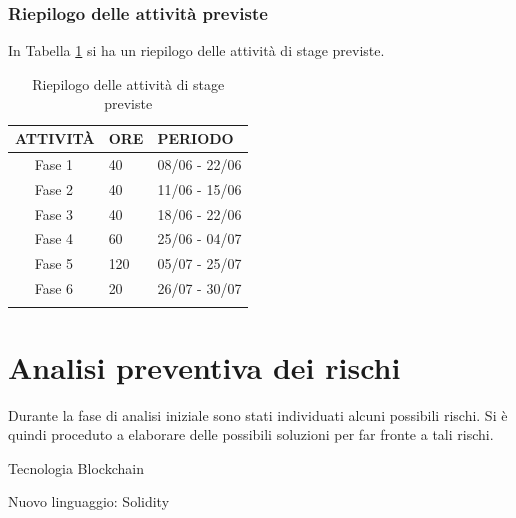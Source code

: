 \subsubsection{Riepilogo delle attività previste}
In Tabella \ref{tab:riepilogoOre} si ha un riepilogo delle attività di stage previste.
\begin{longtable}{|r l|p{1cm}|p{3cm}|}
	\hline
	\multicolumn{2}{|c|}{\textbf{ATTIVITÀ}} & \textbf{ORE} & \textbf{PERIODO}\tabularnewline
	\hline
	& Fase 1 & \centerline{40} & 08/06 - 22/06 \\\hline	
	& Fase 2 & \centerline{40} & 11/06 - 15/06\\\hline
	& Fase 3 & \centerline{40} & 18/06 - 22/06\\\hline
	& Fase 4 & \centerline{60} & 25/06 - 04/07 \\\hline
	& Fase 5 & \centerline{120} & 05/07 - 25/07 \\\hline
	& Fase 6 & \centerline{20} & 26/07 - 30/07 \\\hline	
	\caption{Riepilogo delle attività di stage previste}
	\label{tab:riepilogoOre}
\end{longtable}

\section{Analisi preventiva dei rischi}

Durante la fase di analisi iniziale sono stati individuati alcuni possibili rischi.
Si è quindi proceduto a elaborare delle possibili soluzioni per far fronte a tali rischi.\\

\begin{risk}{Tecnologia Blockchain}
	\label{risk:new-technology}
\end{risk}

\begin{risk}{Nuovo linguaggio: Solidity}
	\label{risk:different-way-of-thinking}
\end{risk}

